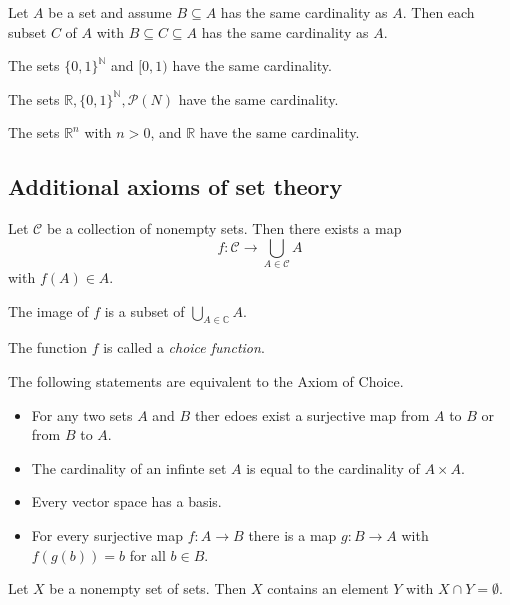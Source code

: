 \begin{corollary}
    Let $A$ be a set and assume $B \subseteq A$ has the same cardinality as $A$.
    Then each subset $C$ of $A$ with $B \subseteq C \subseteq A$ has the same cardinality as $A$.
\end{corollary}

\begin{proposition}
    The sets $ \{0,1\}^\mathbb{N} $ and $ [0,1) $ have the same cardinality.
\end{proposition}

\begin{theorem}
    The sets $ \mathbb{R}, \{0,1\}^\mathbb{N}, \mathscr{P}(N) $ have the same cardinality.
\end{theorem}

\begin{theorem}
    The sets $ \mathbb{R}^n $ with $n>0$, and $ \mathbb{R} $ have the same cardinality.
\end{theorem}

\subsection{Additional axioms of set theory}
\begin{principle}
    Let $ \mathscr{C} $ be a collection of nonempty sets. Then there exists a map
    $$ f: \mathscr{C} \to \bigcup_{A \in \mathscr{C}}A $$
    with $ f(A) \in A $.

    The image of $f$ is a subset of $ \displaystyle\bigcup_{A \in \mathbb{C}}A $.

    The function $f$ is called a \emph{choice function}.
\end{principle}

\begin{principle}
    The following statements are equivalent to the Axiom of Choice.
    \begin{itemize}
        \item For any two sets $A$ and $B$ ther edoes exist a surjective map from $A$ to $B$ or from $B$ to $A$.
        \item The cardinality of an infinte set $A$ is equal to the cardinality of $A \times A$.
        \item Every vector space has a basis.
        \item For every surjective map $ f:A \to B $ there is a map $ g:B \to A $ with $ f(g(b)) = b $ for all $b \in B$.
    \end{itemize}
\end{principle}

\begin{principle}
    Let $X$ be a nonempty set of sets. Then $X$ contains an element $Y$ with $ X \cap Y = \emptyset $.
\end{principle}